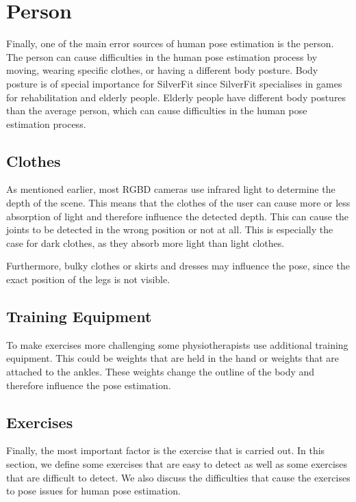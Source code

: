 \section{Person}

Finally, one of the main error sources of human pose estimation is the person. The person can cause difficulties in the human pose estimation process by moving, wearing specific clothes, or having a different body posture. Body posture is of special importance for SilverFit since SilverFit specialises in games for rehabilitation and elderly people. Elderly people have different body postures than the average person, which can cause difficulties in the human pose estimation process.

\subsection{Clothes}

As mentioned earlier, most RGBD cameras use infrared light to determine the depth of the scene. This means that the clothes of the user can cause more or less absorption of light and therefore influence the detected depth. This can cause the joints to be detected in the wrong position or not at all. This is especially the case for dark clothes, as they absorb more light than light clothes.

Furthermore, bulky clothes or skirts and dresses may influence the pose, since the exact position of the legs is not visible.

\subsection{Training Equipment}

To make exercises more challenging some physiotherapists use additional training equipment. This could be weights that are held in the hand or weights that are attached to the ankles. These weights change the outline of the body and therefore influence the pose estimation. 

\subsection{Exercises}

Finally, the most important factor is the exercise that is carried out. In this section, we define some exercises that are easy to detect as well as some exercises that are difficult to detect. We also discuss the difficulties that cause the exercises to pose issues for human pose estimation.

